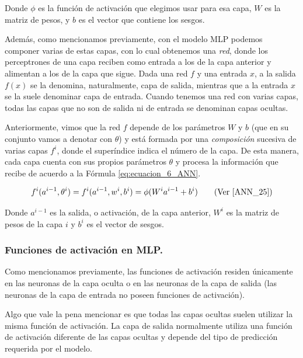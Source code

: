 \documentclass[12pt,a4paper]{article}
\begin{document}
\begin{sloppypar}
Donde $\phi$ es la función de activación que elegimos usar para esa capa, $W$ es la matriz de pesos, y $b$ es el vector que contiene los sesgos.

Además, como mencionamos previamente, con el modelo MLP podemos componer varias de estas capas, con lo cual obtenemos una \textit{red}, donde los perceptrones de una capa reciben como entrada a los de la capa anterior y alimentan a los de la capa que sigue. Dada una red $f$ y una entrada $x$, a la salida $f(x)$ se la denomina, naturalmente, capa de salida, mientras que a la entrada $x$ se la suele denominar capa de entrada. Cuando tenemos una red con varias capas, todas las capas que no son de salida ni de entrada se denominan capas ocultas. 

Anteriormente, vimos que la red $f$ depende de los parámetros $W$ y $b$ (que en su conjunto vamos a denotar con $\theta$) y está formada por una \textit{composición} sucesiva de varias capas $f^i$, donde el superíndice indica el número de la capa. De esta manera, cada capa cuenta con sus propios parámetros $\theta$ y procesa la información que recibe de acuerdo a la Fórmula \ref{eq:ecuacion_6_ANN}.

\begin{equation}\label{eq:ecuacion_6_ANN}
f^i(a^{i-1},\theta^i) = f^i(a^{i-1},w^i,b^i) = \phi(W^{i}a^{i-1}+b^i)    \qquad  \text{(Ver \cite{ANN_25})}
\end{equation}

Donde $a^{i-1}$ es la salida, o activación, de la capa anterior, $W^i$ es la matriz de pesos de la capa $i$ y $b^i$ es el vector de sesgos.

\subsubsection{Funciones de activación en MLP.}\label{Func_activ}

Como mencionamos previamente, las funciones de activación residen únicamente en las neuronas de la capa oculta o en las neuronas de la capa de salida (las neuronas de la capa de entrada no poseen funciones de activación).

Algo que vale la pena mencionar es que todas las capas ocultas suelen utilizar la misma función de activación. La capa de salida normalmente utiliza una función de activación diferente de las capas ocultas y depende del tipo de predicción requerida por el modelo.


\end{sloppypar}
\end{document}
